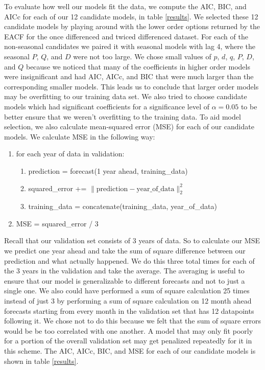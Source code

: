 \documentclass[11pt]{paper}
\begin{document}
To evaluate how well our models fit the data, we compute the AIC, BIC, and AICc for each of our 12 candidate models, in table \ref{results}. We selected these 12 candidate models by playing around with the lower order options returned by the EACF for the once differenced and twiced differenced dataset. For each of the non-seasonal candidates we paired it with seasonal models with lag 4, where the seasonal $P$, $Q$, and $D$ were not too large. We chose small values of $p$, $d$, $q$, $P$, $D$, and $Q$ because we noticed that many of the coefficients in higher order models were insignificant and had AIC, AICc, and BIC that were much larger than the corresponding smaller models. This leads us to conclude that larger order models may be overfitting to our training data set. We also tried to choose candidate models which had significant coefficients for a significance level of $\alpha = 0.05$ to be better ensure that we weren't overfitting to the training data. To aid model selection, we also calculate mean-squared error (MSE) for each of our candidate models. We calculate MSE in the following way:

\begin{algo}
\begin{enumerate}
    \item for each year of data in validation:
    \begin{enumerate}
        \item prediction = forecast(1 year ahead, training_data)
        \item squared_error += $\| \text{prediction} - \text{year_of_data}\|_2^2$
        \item training_data = concatenate(training_data, year_of_data)
    \end{enumerate}
    \item MSE = squared_error / 3
\end{enumerate}
\end{algo}

Recall that our validation set consists of 3 years of data. So to calculate our MSE we predict one year ahead and take the sum of square difference between our prediction and what actually happened. We do this three total times for each of the 3 years in the validation and take the average. The averaging is useful to ensure that our model is generalizable to different forecasts and not to just a single one. We also could have performed a sum of square calculation 25 times instead of just 3 by performing a sum of square calculation on 12 month ahead forecasts starting from every month in the validation set that has 12 datapoints following it. We chose not to do this because we felt that the sum of square errors would be be too correlated with one another. A model that may only fit poorly for a portion of the overall validation set may get penalized repeatedly for it in this scheme. The AIC, AICc, BIC, and MSE for each of our candidate models is shown in table \ref{results}.
\end{document}
